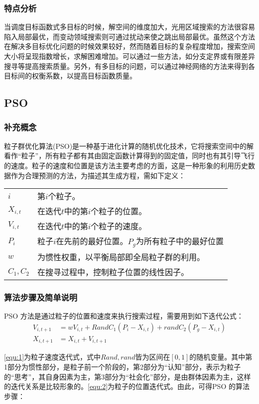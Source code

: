 \subsubsection{特点分析}
当调度目标函数式多目标的时候，解空间的维度加大，光用区域搜索的方法很容易陷入局部最优，而变动领域搜索则可通过扰动来使之跳出局部最优。虽然这个方法在解决多目标优化问题的时候效果较好，然而随着目标的复杂程度增加，搜索空间大小将呈现指数增长，求解困难增加。可以通过一些方法，如分支定界或有限差异搜寻等提高搜索质量。另外，有多目标的问题，可以通过神经网络的方法来得到各目标间的权衡系数，以提高目标函数质量。
\subsection{PSO}
\subsubsection{补充概念}
粒子群优化算法(PSO)是一种基于进化计算的随机优化技术，它将搜索空间中的解看作``粒子''，所有粒子都有其由固定函数计算得到的固定值，同时也有其引导飞行的速度。粒子的速度和位置是该方法主要考虑的方面，这是一种形象的利用历史数据作为合理预测的方法，为描述其生成方程，需如下定义：

\vspace{1em}	
\begin{tabular}{ll}	
$i$ & 第$i$个粒子。\\
$X_{i,t}$ & 在迭代$t$中的第$i$个粒子的位置。\\
$V_{i,t}$& 在迭代$t$中的第$i$个粒子的速度。\\
$P_i$&粒子$i$在先前的最好位置。$P_g$为所有粒子中的最好位置\\
$w$&为惯性权重，以平衡局部即全局粒子群的利用。\\
$C_1,C_2$& 在搜寻过程中，控制粒子位置的线性因子。
\end{tabular}
\subsubsection{算法步骤及简单说明}
PSO 方法是通过粒子的位置和速度来执行搜索过程，需要用到如下迭代公式：
\begin{align}
V_{i,t+1} &= wV_{i,t} + Rand C_1(P_i - X_{i,t}) + rand C_2 (P_g - X_{i,t})\label{equ:1}\\
X_{i,t+1} &= X_{i,t} + V_{i,t+1}\label{equ:2}
\end{align}

\eqref{equ:1}为粒子速度迭代式，式中$Rand,rand$皆为区间在$[0,1]$的随机变量。其中第1部分为惯性部分，是粒子前一个阶段的，第2部分为``认知''部分，表示为粒子的``思考''，其自身因素为主，第3部分为``社会化''部分，是由群体因素为主，这样的迭代关系是比较形象的。\eqref{equ:2}为粒子的位置迭代式。由此，可得PSO 的算法步骤：

